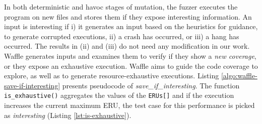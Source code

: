
In both deterministic and havoc stages of mutation, the fuzzer executes the program on new files and stores them if they expose interesting information. An input is interesting if i) it generates an input based on the heuristics for guidance, to generate corrupted executions, ii) a crash has occurred, or iii) a hang has occurred. The results in (ii) and (iii) do not need any modification in our work. Waffle generates inputs and examines them to verify if they show a \textit{new coverage}, or they expose an exhaustive execution. Waffle aims to guide the code coverage to explore, as well as to generate resource-exhaustive executions. Listing \ref{algo:waffle-save-if-interesting} presents pseudocode of \textit{save\_if\_interesting}. The function \texttt{is\_exhaustive()} aggregates the values of the \texttt{ERUs[]} and if the execution increases the current maximum ERU, the test case for this performance is picked as \textit{interesting} (Listing \ref{lst:is-exhaustive}).




\begin{minipage}{\linewidth}

\end{minipage}